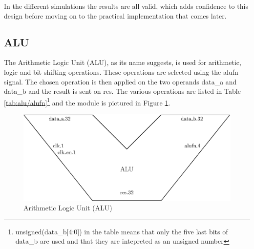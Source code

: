 In the different simulations the results are all valid, which adds confidence to this design before 
moving on to the practical implementation that comes later.

\subsection{ALU}

The Arithmetic Logic Unit (ALU), as its name suggests, is used for arithmetic, logic and bit shifting 
operations. These operations are selected using the alufn signal. The chosen operation is then 
applied on the two operands data\_a and data\_b and the result is sent on res. The various
operations are listed in Table \ref{tab:alu/alufn}\footnote{unsigned(data\_b[4:0]) in the table means 
that only the five last bits of data\_b are used and that they are intepreted as an unsigned number
} and the module is pictured in Figure \ref{fig:components/alu}. 

\begin{figure}[ht]
    \centering
    \includegraphics[scale=0.8]{Chapter3-CPU/res/alu}
    \caption{Arithmetic Logic Unit (ALU)}
    \label{fig:components/alu}
\end{figure}

